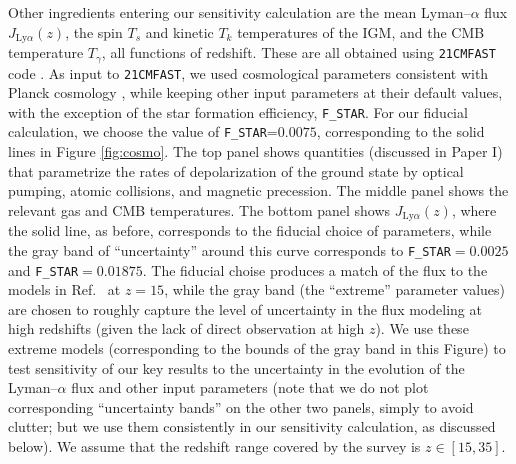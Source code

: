 Other ingredients entering our sensitivity calculation are the mean Lyman--$\alpha$ flux $J_{\text{Ly}\alpha}(z)$, the spin $T_s$ and kinetic $T_k$ temperatures of the IGM, and the CMB temperature $T_\gamma$, all functions of redshift. These are all obtained using \texttt{21CMFAST} code \cite{2011MNRAS.411..955M}. As input to \texttt{21CMFAST}, we used cosmological parameters consistent with Planck cosmology \cite{2015arXiv150201589P}, while keeping other input parameters at their default values, with the exception of the star formation efficiency, \verb|F_STAR|. For our fiducial calculation, we choose the value of \verb|F_STAR|=$0.0075$, corresponding to the solid lines in Figure \ref{fig:cosmo}. The top panel shows quantities (discussed in Paper I) that parametrize the rates of depolarization of the ground state by optical pumping, atomic collisions, and magnetic precession. The middle panel shows the relevant gas and CMB temperatures. The bottom panel shows $J_{\text{Ly}\alpha}(z)$, where the solid line, as before, corresponds to the fiducial choice of parameters, while the gray band of ``uncertainty'' around this curve corresponds to \verb|F_STAR|$=0.0025$ and \verb|F_STAR|$=0.01875$. The fiducial choise produces a match of the flux to the models in Ref.~\cite{2012ApJ...746..125H} at $z=15$, while the gray band (the ``extreme'' parameter values) are chosen to roughly capture the level of uncertainty in the flux modeling at high redshifts (given the lack of direct observation at high $z$). We use these extreme models (corresponding to the bounds of the gray band in this Figure) to test sensitivity of our key results to the uncertainty in the evolution of the Lyman--$\alpha$ flux and other input parameters (note that we do not plot corresponding ``uncertainty bands'' on the other two panels, simply to avoid clutter; but we use them consistently in our sensitivity calculation, as discussed below). We assume that the redshift range covered by the survey is $z\in[15,35]$. %


